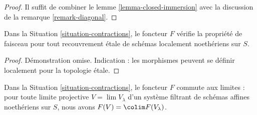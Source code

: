 \begin{proof}
Il suffit de combiner le lemme \ref{lemma-closed-immersion}
avec la discussion de la remarque \ref{remark-diagonal}.
\end{proof}

\begin{lemma}
\label{lemma-sheaf}
Dans la Situation \ref{situation-contractions}, le foncteur
$F$ vérifie la propriété de faisceau pour tout recouvrement \'etale
de schémas localement noethériens sur $S$.
\end{lemma}

\begin{proof}
Démonstration omise. Indication : les morphismes peuvent se définir localement pour la topologie \'etale.
\end{proof}

\begin{lemma}
\label{lemma-limit-preserving}
Dans la Situation \ref{situation-contractions}, le foncteur $F$ commute aux limites :
pour toute limite projective $V = \lim V_\lambda$ d'un système filtrant de schémas affines noethériens
sur $S$, nous avons $F(V) = \colim F(V_\lambda)$.
\end{lemma}

